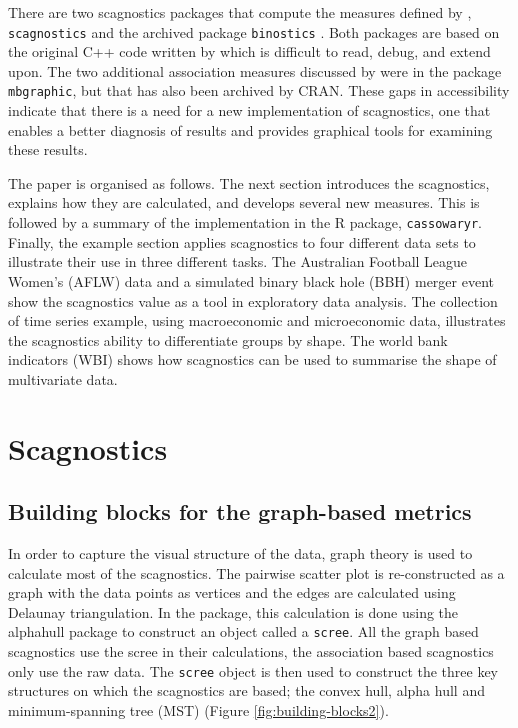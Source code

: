 There are two scagnostics packages that compute the measures defined by \citet{scag}, \texttt{scagnostics} \citep{scagdist} and the archived package \texttt{binostics} \citep{binostics}. Both packages are based on the original C++ code written by \citet{scagdist} which is difficult to read, debug, and extend upon. The two additional association measures discussed by \citet{Grimm} were in the package \texttt{mbgraphic}, but that has also been archived by CRAN. These gaps in accessibility indicate that there is a need for a new implementation of scagnostics, one that enables a better diagnosis of results and provides graphical tools for examining these results.

The paper is organised as follows. The next section introduces the scagnostics, explains how they are calculated, and develops several new measures. This is followed by a summary of the implementation in the R package, \texttt{cassowaryr}. Finally, the example section applies scagnostics to four different data sets to illustrate their use in three different tasks. The Australian Football League Women's (AFLW) data and a simulated binary black hole (BBH) merger event show the scagnostics value as a tool in exploratory data analysis. The collection of time series example, using macroeconomic and microeconomic data, illustrates the scagnostics ability to differentiate groups by shape. The world bank indicators (WBI) shows how scagnostics can be used to summarise the shape of multivariate data.

\section{Scagnostics}\label{scagnostics}

\subsection{Building blocks for the graph-based metrics}\label{building-blocks-for-the-graph-based-metrics}

In order to capture the visual structure of the data, graph theory is used to calculate most of the scagnostics. The pairwise scatter plot is re-constructed as a graph with the data points as vertices and the edges are calculated using Delaunay triangulation. In the package, this calculation is done using the alphahull package \citep{alphahull} to construct an object called a \texttt{scree}. All the graph based scagnostics use the scree in their calculations, the association based scagnostics only use the raw data. The \texttt{scree} object is then used to construct the three key structures on which the scagnostics are based; the convex hull, alpha hull and minimum-spanning tree (MST) (Figure \ref{fig:building-blocks2}).

